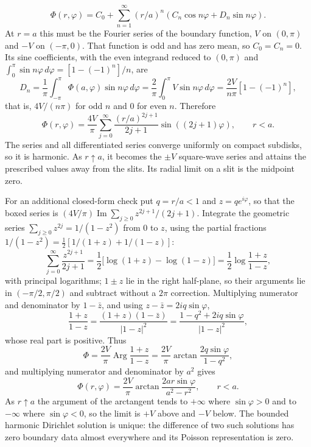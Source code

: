 \[
\Phi(r,\varphi)=C_0+\sum_{n=1}^{\infty}
(r/a)^n(C_n\cos n\varphi+D_n\sin n\varphi).
\]
At $r=a$ this must be the Fourier series of the boundary function,
$V$ on $(0,\pi)$ and $-V$ on $(-\pi,0)$. That function is odd and has
zero mean, so $C_0=C_n=0$. Its sine coefficients, with the even
integrand reduced to $(0,\pi)$ and
$\int_0^\pi\sin n\varphi\,d\varphi=[1-(-1)^n]/n$, are
\[
D_n=\frac1\pi\int_{-\pi}^{\pi}\Phi(a,\varphi)\sin n\varphi\,d\varphi
=\frac2\pi\int_0^\pi V\sin n\varphi\,d\varphi
=\frac{2V}{n\pi}[1-(-1)^n],
\]
that is, $4V/(n\pi)$ for odd $n$ and $0$ for even $n$. Therefore
\[
\boxed{\Phi(r,\varphi)=\frac{4V}{\pi}\sum_{j=0}^{\infty}
\frac{(r/a)^{2j+1}}{2j+1}\sin((2j+1)\varphi),\qquad r<a.}
\]
The series and all differentiated series converge uniformly on compact
subdisks, so it is harmonic. As $r\uparrow a$, it becomes the $\pm V$
square-wave series and attains the prescribed values away from the slits.
Its radial limit on a slit is the midpoint zero.

For an additional closed-form check put $q=r/a<1$ and $z=qe^{i\varphi}$,
so that the boxed series is
$(4V/\pi)\operatorname{Im}\sum_{j\ge0}z^{2j+1}/(2j+1)$. Integrate the
geometric series $\sum_{j\ge0}z^{2j}=1/(1-z^2)$ from $0$ to $z$, using
the partial fractions $1/(1-z^2)=\frac12[1/(1+z)+1/(1-z)]$:
\[
\sum_{j=0}^{\infty}\frac{z^{2j+1}}{2j+1}
=\frac12\bigl[\log(1+z)-\log(1-z)\bigr]
=\frac12\log\frac{1+z}{1-z},
\]
with principal logarithms; $1\pm z$ lie in the right half-plane, so
their arguments lie in $(-\pi/2,\pi/2)$ and subtract without a $2\pi$
correction. Multiplying numerator and denominator by $1-\bar z$, and
using $z-\bar z=2iq\sin\varphi$,
\[
\frac{1+z}{1-z}=\frac{(1+z)(1-\bar z)}{|1-z|^2}
=\frac{1-q^2+2iq\sin\varphi}{|1-z|^2},
\]
whose real part is positive. Thus
\[
\Phi=\frac{2V}\pi\operatorname{Arg}\frac{1+z}{1-z}
=\frac{2V}\pi\arctan\frac{2q\sin\varphi}{1-q^2},
\]
and multiplying numerator and denominator by $a^2$ gives
\[
\boxed{\Phi(r,\varphi)=\frac{2V}{\pi}
\arctan\frac{2ar\sin\varphi}{a^2-r^2},\qquad r<a.}
\]
As $r\uparrow a$ the argument of the arctangent tends to $+\infty$ where
$\sin\varphi>0$ and to $-\infty$ where $\sin\varphi<0$, so the limit is
$+V$ above and $-V$ below. The bounded harmonic Dirichlet
solution is unique: the difference of two such solutions has zero
boundary data almost everywhere and its Poisson representation is zero.

